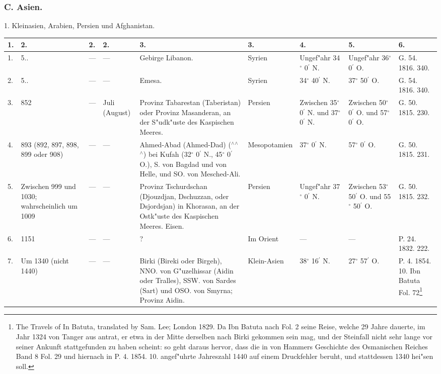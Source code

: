 \documentclass[a4paper, 8pt, oneside, polutonikogreek, german]{article}
\begin{document}
\subsubsection{C. Asien.}
1. Kleinasien, Arabien, Persien und Afghanistan.
\begin{center}
    \footnotesize
    \begin{longtable}{|p{3mm}|p{12mm}|p{5mm}|p{13mm}|p{25mm}|p{20mm}|p{13mm}|p{13mm}|p{13mm}|}
    \hline
        1. & 2. & 2. & 2. & 3. & 3. & 4. & 5. & 6. \\ \hline
        1. & 5.. & --- & --- & Gebirge Libanon. & Syrien & Ungef"ahr 34$^\circ$ 0$^\prime$ N. & Ungef"ahr 36$^\circ$ 0$^\prime$ O. & G. 54. 1816. 340. \\ \hline
        2. & 5.. & --- & --- & Emesa. & Syrien & 34$^\circ$ 40$^\prime$ N. & 37$^\circ$ 50$^\prime$ O. & G. 54. 1816. 340. \\ \hline
        3. & 852 & --- & Juli (August) & Provinz Tabarestan (Taberistan) oder Provinz Masanderan, an der S"udk"uste des Kaspischen Meeres. & Persien & Zwischen 35$^\circ$ 0$^\prime$ N. und 37$^\circ$ 0$^\prime$ N. & Zwischen 50$^\circ$ 0$^\prime$ O. und 57$^\circ$ 0$^\prime$ O. & G. 50. 1815. 230. \\ \hline
        4. & 893 (892, 897, 898, 899 oder 908) & --- & --- & Ahmed-Abad (Ahmed-Dad) ($^\wedge$$^\wedge$$^\wedge$) bei Kufah (32$^\circ$ 0$^\prime$ N., 45$^\circ$ 0$^\prime$ O.), S. von Bagdad und von Helle, und SO. von Mesched-Ali. & Mesopotamien & 37$^\circ$ 0$^\prime$ N. & 57$^\circ$ 0$^\prime$ O. & G. 50. 1815. 231. \\ \hline
        5. & Zwischen 999 und 1030; wahrscheinlich um 1009 & --- & --- & Provinz Tschurdschan (Djouzdjan, Dschuzzan, oder Dsjordsjan) in Khorasan, an der Ostk"uste des Kaspischen Meeres. Eisen. & Persien & Ungef"ahr 37$^\circ$ 0$^\prime$ N. & Zwischen 53$^\circ$ 50$^\prime$ O. und 55$^\circ$ 50$^\prime$ O. & G. 50. 1815. 232. \\ \hline
        6. & 1151 & --- & --- & ? & Im Orient & --- & --- & P. 24. 1832. 222. \\ \hline
        7. & Um 1340 (nicht 1440) & --- & --- & Birki (Bireki oder Birgeh), NNO. von G"uzelhissar (Aidin oder Tralles), SSW. von Sardes (Sart) und OSO. von Smyrna; Provinz Aidin. & Klein-Asien & 38$^\circ$ 16$^\prime$ N. & 27$^\circ$ 57$^\prime$ O. & P. 4. 1854. 10. Ibn Batuta Fol. 72\footnote{The Travels of In Batuta, translated by Sam. Lee; London 1829. Da Ibn Batuta nach Fol. 2 seine Reise, welche 29 Jahre dauerte, im Jahr 1324 von Tanger aus antrat, er etwa in der Mitte derselben nach Birki gekommen sein mag, und der Steinfall nicht sehr lange vor seiner Ankunft stattgefunden zu haben scheint: so geht daraus hervor, dass die in von Hammers Geschichte des Osmanischen Reiches Band 8 Fol. 29 und hiernach in P. 4. 1854. 10. angef"uhrte Jahreszahl 1440 auf einem Druckfehler beruht, und stattdessen 1340 hei"sen soll.} \\ \hline

\end{longtable}
\end{center}
\end{document}
